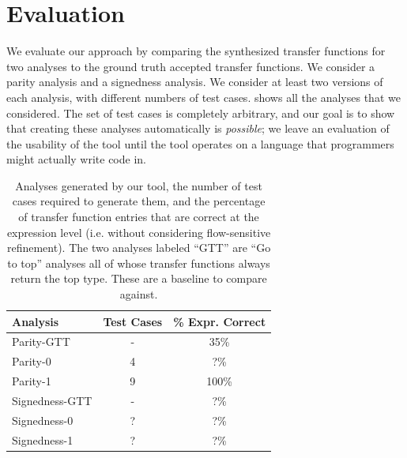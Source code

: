 \documentclass[10pt,conference]{IEEEtran}
\begin{document}
\section{Evaluation}
\label{sec-eval}


We evaluate our approach by comparing the synthesized transfer
functions for two analyses to the ground truth accepted transfer
functions. We consider a parity analysis and a signedness analysis.
We consider at least two versions of each analysis, with different
numbers of test cases.
 shows all the analyses that we considered.
The set of test cases is completely arbitrary,
and our goal is to show that creating these analyses automatically
is \emph{possible}; we leave an evaluation of the usability of the
tool until the tool operates on a language that programmers might
actually write code in.

\begin{table}
\centering
 \begin{tabular}{l c c }
  Analysis & Test Cases & \% Expr. Correct \\ 
  \midrule
  Parity-GTT & - & 35\% \\
  Parity-0 & 4 & ?\% \\
  Parity-1 & 9 & 100\% \\
  \midrule
  Signedness-GTT & - & ?\% \\
  Signedness-0 & ? & ?\% \\
  Signedness-1 & ? & ?\% \\
 \end{tabular}
 \caption{Analyses generated by our tool, the number of test cases
 required to generate them, and the percentage of transfer function
 entries that are correct at the expression level (i.e. without
 considering flow-sensitive refinement). The two analyses labeled
 ``GTT'' are ``Go to top'' analyses all of whose transfer functions
 always return the top type. These are a baseline to compare against.}
 \label{tab-analyses}
\end{table}
\end{document}
